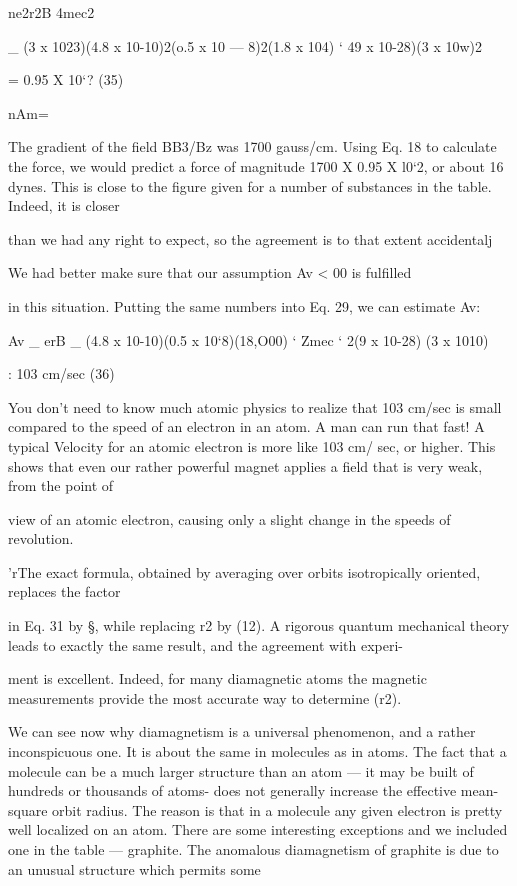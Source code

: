 {ne2r2B
4mec2

_ (3 x 1023)(4.8 x 10-10)2(o.5 x 10 --- 8)2(1.8 x 104)
‘ 49 x 10-28)(3 x 10w)2

= 0.95 X 10‘? (35)

nAm=

The gradient of the field BB3/Bz was 1700 gauss/cm. Using Eq. 18
to calculate the force, we would predict a force of magnitude
1700 X 0.95 X l0‘2, or about 16 dynes. This is close to the figure
given for a number of substances in the table. Indeed, it is closer

than we had any right to expect, so the agreement is to that extent
accidentalj

We had better make sure that our assumption Av < 00 is fulfilled

in this situation. Putting the same numbers into Eq. 29, we can
estimate Av:

\begin{equation}
\end{equation}
Av _ erB _ (4.8 x 10-10)(0.5 x 10‘8)(18,O00)
‘ Zmec ‘ 2(9 x 10-28) (3 x 1010)

: 103 cm/sec (36)

You don't need to know much atomic physics to realize that
103 cm/sec is small compared to the speed of an electron in an atom.
A man can run that fast! A typical Velocity for an atomic electron
is more like 103 cm/ sec, or higher. This shows that even our rather
powerful magnet applies a field that is very weak, from the point of

view of an atomic electron, causing only a slight change in the speeds
of revolution.

'rThe exact formula, obtained by averaging over orbits isotropically oriented, replaces
the factor } in Eq. 31 by §, while replacing r2 by (12). A rigorous quantum
mechanical theory leads to exactly the same result, and the agreement with experi-

ment is excellent. Indeed, for many diamagnetic atoms the magnetic measurements
provide the most accurate way to determine (r2).

We can see now why diamagnetism is a universal phenomenon,
and a rather inconspicuous one. It is about the same in molecules
as in atoms. The fact that a molecule can be a much larger structure
than an atom --- it may be built of hundreds or thousands of atoms-
does not generally increase the effective mean-square orbit radius.
The reason is that in a molecule any given electron is pretty well
localized on an atom. There are some interesting exceptions and
we included one in the table --- graphite. The anomalous 
diamagnetism of graphite is due to an unusual structure which permits some

